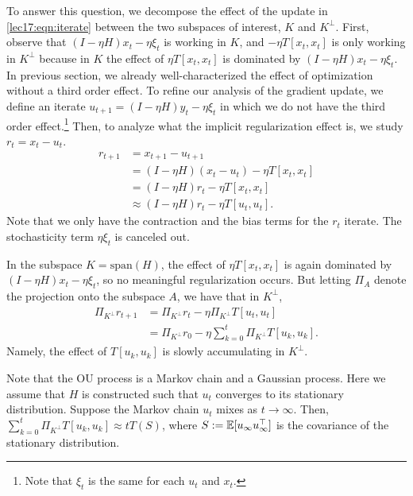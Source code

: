 To answer this question, we decompose the effect of the update in \eqref{lec17:eqn:iterate} between the two subspaces of interest, $K$ and $K^\perp$. First, observe that $(I-\eta H)x_t - \eta \xi_t$ is working in $K$, and $- \eta T [x_t,x_t]$ is only working in $K^\perp$ because in $K$ the effect of $\eta T [x_t,x_t]$ is dominated by $(I-\eta H)x_t - \eta \xi_t$. In previous section, we already well-characterized the effect of optimization without a third order effect. To refine our analysis of the gradient update, we define an iterate $u_{t+1} = (I - \eta H)y_t - \eta \xi_t$ in which we do not have the third order effect.\footnote{Note that $\xi_t$ is the same for each $u_t$ and $x_t$.} Then, to analyze what the implicit regularization effect is, we study $r_t = x_t - u_t$.
\begin{align*}
r_{t + 1} &= x_{t+1} - u_{t+1}\\
&= (I-\eta H)(x_t - u_t) - \eta T[x_t,x_t]\\
&= (I-\eta H)r_t - \eta T[x_t,x_t]\\
&\approx (I-\eta H)r_t - \eta T[u_t,u_t].
\end{align*}
Note that we only have the contraction and the bias terms for the $r_t$ iterate. The stochasticity term $\eta \xi_t$ is canceled out. 

In the subspace $K = \text{span}(H)$, the effect of $\eta T [x_t,x_t]$ is again dominated by $(I-\eta H)x_t - \eta \xi_t$, so no meaningful regularization occurs. But letting $\Pi_{A}$ denote the projection onto the subspace $A$, we have that in $K^\perp$,
\begin{align}
\Pi_{K^\perp}r_{t+1} &= \Pi_{K^\perp}r_t - \eta \Pi_{K^\perp} T[u_t,u_t]\\
&=\Pi_{K^\perp}r_0 - \eta \sum_{k=0}^{t}\Pi_{K^\perp}T[u_k,u_k].
\end{align}
Namely, the effect of $T[u_k,u_k]$ is slowly accumulating in ${K^\perp}$.

Note that the OU process is a Markov chain and a Gaussian process. Here we assume that $H$ is constructed such that $u_t$ converges to its stationary distribution. Suppose the Markov chain $u_t$ mixes as $t\rightarrow \infty$. Then, $\sum_{k=0}^{t}\Pi_{K^\perp}T[u_k,u_k] \approx tT(S)$, where $S:=\operatorname*{\mathbb{E}}[u_{\infty}u_{\infty}^\top]$ is the covariance of the stationary distribution.

